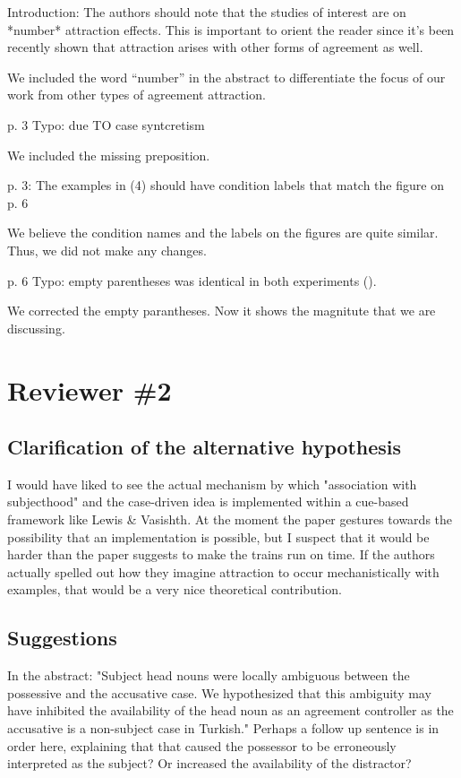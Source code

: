 \documentclass{response}
\begin{document}
\RC Introduction: The authors should note that the studies of interest are on *number* attraction effects. This is important to orient the reader since it’s been recently shown that attraction arises with other forms of agreement as well. 

\AR We included the word ``number'' in the abstract to differentiate the focus of our work from other types of agreement attraction.

\RC p. 3 Typo: due TO case syntcretism

\AR We included the missing preposition.

\RC p. 3: The examples in (4) should have condition labels that match the figure on p. 6

\AR We believe the condition names and the labels on the figures are quite similar. Thus, we did not make any changes.

\RC p. 6 Typo: empty parentheses was identical in both experiments (). 

\AR We corrected the empty parantheses. Now it shows the magnitute that we are discussing.

\section{Reviewer \#2}

\subsection{Clarification of the alternative hypothesis}

\RC I would have liked to see the actual mechanism by which "association with subjecthood" and the case-driven idea is implemented within a cue-based framework like Lewis & Vasishth. At the moment the paper gestures towards the possibility that an implementation is possible, but I suspect that it would be harder than the paper suggests to make the trains run on time. If the authors actually spelled out how they imagine attraction to occur mechanistically with examples, that would be a very nice theoretical contribution. 

\AR 

\subsection{Suggestions}

\RC In the abstract: "Subject head nouns were locally ambiguous between the possessive and the accusative case. We hypothesized that this ambiguity may have inhibited the availability of the head noun as an agreement controller as the accusative is a non-subject case in Turkish." Perhaps a follow up sentence is in order here, explaining that that caused the possessor to be erroneously interpreted as the subject? Or increased the availability of the distractor? 
\end{document}
